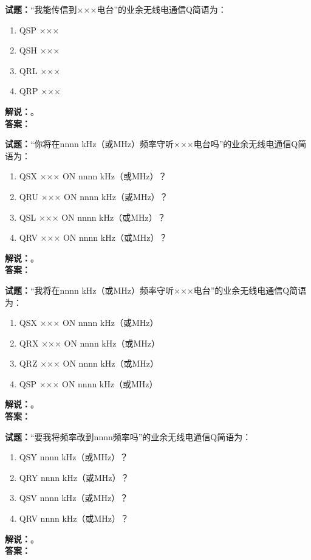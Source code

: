 \documentclass{ctexbook}
\begin{document}
\vspace{\baselineskip}

\noindent\textbf{试题：}“我能传信到×××电台”的业余无线电通信Q简语为：
\begin{enumerate}[leftmargin=3em]
  \item QSP ×××
  \item QSH ×××
  \item QRL ×××
  \item QRP ×××
\end{enumerate}
\noindent\textbf{解说：}\textbf{}。\\\noindent\textbf{答案：}

\vspace{\baselineskip}

\noindent\textbf{试题：}“你将在nnnn \si{\kHz}（或\unit{\MHz}）频率守听×××电台吗”的业余无线电通信Q简语为：
\begin{enumerate}[leftmargin=3em]
  \item QSX ××× ON nnnn \si{\kHz}（或\unit{\MHz}）？
  \item QRU ××× ON nnnn \si{\kHz}（或\unit{\MHz}）？
  \item QSL ××× ON nnnn \si{\kHz}（或\unit{\MHz}）？
  \item QRV ××× ON nnnn \si{\kHz}（或\unit{\MHz}）？
\end{enumerate}
\noindent\textbf{解说：}\textbf{}。\\\noindent\textbf{答案：}

\vspace{\baselineskip}

\noindent\textbf{试题：}“我将在nnnn \si{\kHz}（或\unit{\MHz}）频率守听×××电台”的业余无线电通信Q简语为：
\begin{enumerate}[leftmargin=3em]
  \item QSX ××× ON nnnn \si{\kHz}（或\unit{\MHz}）
  \item QRX ××× ON nnnn \si{\kHz}（或\unit{\MHz}）
  \item QRZ ××× ON nnnn \si{\kHz}（或\unit{\MHz}）
  \item QSP ××× ON nnnn \si{\kHz}（或\unit{\MHz}）
\end{enumerate}
\noindent\textbf{解说：}\textbf{}。\\\noindent\textbf{答案：}

\vspace{\baselineskip}

\noindent\textbf{试题：}“要我将频率改到nnnn频率吗”的业余无线电通信Q简语为：
\begin{enumerate}[leftmargin=3em]
  \item QSY nnnn \si{\kHz}（或\unit{\MHz}）？
  \item QRY nnnn \si{\kHz}（或\unit{\MHz}）？
  \item QSV nnnn \si{\kHz}（或\unit{\MHz}）？
  \item QRV nnnn \si{\kHz}（或\unit{\MHz}）？
\end{enumerate}
\noindent\textbf{解说：}\textbf{}。\\\noindent\textbf{答案：}
\end{document}
